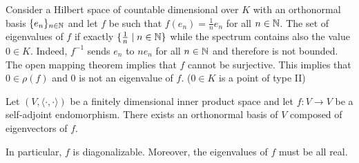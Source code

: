 \begin{exampleenv}
    Consider a Hilbert space of countable dimensional over $K$ with an orthonormal basis $\{e_n\}_{n\in\mathbb{N}}$ and let $f$ be such that $f(e_n) = \frac{1}{n} e_n$ for all $n\in \mathbb{N}$.
    The set of eigenvalues of $f$ if exactly $\{\frac{1}{n} \mid n\in \mathbb{N}\}$ while the spectrum contains also the value $0\in K$.
    Indeed, $f^{-1}$ sends $e_n$ to $ne_n$ for all $n\in \mathbb{N}$ and therefore is not bounded.
    The open mapping theorem implies that $f$ cannot be surjective.
    This implies that $0\in \rho(f)$ and $0$ is not an eigenvalue of $f$.
    ($0\in K$ is a point of type II)
\end{exampleenv}
\begin{theoremenv}
    Let $\left(V, \langle\cdot,\cdot\rangle\right)$ be a finitely dimensional inner product space and let $f:V\rightarrow V$ be a self-adjoint endomorphism.
    There exists an orthonormal basis of $V$ composed of eigenvectors of $f$.
    
    \quad In particular, $f$ is diagonalizable.
    Moreover, the eigenvalues of $f$ must be all real. 
\end{theoremenv}
